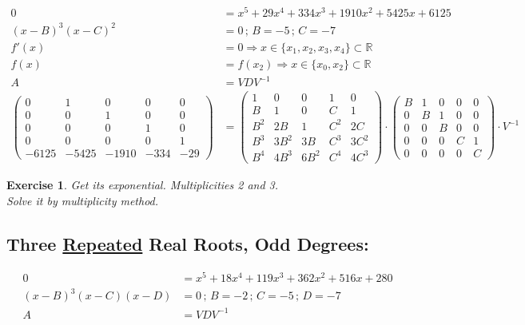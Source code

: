 \documentclass[12pt,a4paper]{article}
\newtheorem{exercise}{Exercise}[section]
\begin{document}
\begin{align}
0 &= x^5 + 29 x^4 + 334 x^3 + 1910 x^2 + 5425 x + 6125 \\
(x - B)^3 (x - C)^2 &= 0\,;\,B = -5\,;\,C = -7 \\
f'(x) &= 0 \Rightarrow x \in \{ x_1, x_2, x_3, x_4 \} \subset \mathbb{R} \\
f(x) &= f(x_2) \Rightarrow x \in \{ x_0, x_2 \} \subset \mathbb{R} \\
A &= VDV^{-1} \\
\left( \begin{matrix} 0&1&0&0&0 \\ 0&0&1&0&0 \\ 0&0&0&1&0 \\ 0&0&0&0&1 \\ -6125 & -5425 & -1910 & -334 & -29 \end{matrix} \right)
&=
\left( \begin{matrix} 1&0&0&1&0 \\ B&1&0&C&1 \\ B^2&2B&1&C^2&2C \\ B^3&3B^2&3B&C^3&3C^2 \\ B^4&4B^3&6B^2&C^4&4C^3 \end{matrix} \right) \cdot
\left( \begin{matrix} B & 1&0&0&0 \\ 0 & B&1&0&0 \\ 0 & 0 & B & 0 & 0 \\ 0 & 0 & 0 & C & 1 \\ 0 & 0 & 0 & 0 & C \end{matrix} \right) \cdot V^{-1}
\end{align}

\begin{exercise}
Get its exponential. Multiplicities 2 and 3. \\
Solve it by multiplicity method.
\end{exercise}

\subsection{Three \href{}{Repeated} Real Roots, Odd Degrees:}

\begin{align}
0 &= x^5 + 18 x^4 + 119 x^3 + 362 x^2 + 516 x + 280 \\
(x - B)^3 (x - C)(x - D) &= 0\,;\,B = -2\,;\,C = -5\,;\,D = -7 \\
A &= VDV^{-1}
\end{align}
\end{document}
